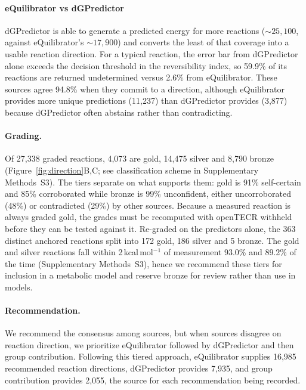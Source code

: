 \documentclass[unnumsec,webpdf,modern,large]{oup-authoring-template}
\begin{document}
\paragraph{eQuilibrator vs dGPredictor} dGPredictor is able to generate a predicted energy for more reactions ($\sim25,100$, against eQuilibrator's $\sim17,900$) and converts the least of that coverage into a usable reaction direction.
For a typical reaction, the error bar from dGPredictor alone exceeds the decision threshold in the reversibility index, so 59.9\% of its reactions are returned undetermined versus 2.6\% from eQuilibrator.
These sources agree 94.8\% when they commit to a direction, although eQuilibrator provides more unique predictions (11,237) than dGPredictor provides (3,877) because dGPredictor often abstains rather than contradicting.

\paragraph{Grading.} Of 27,338 graded reactions, 4,073 are gold, 14,475 silver and 8,790 bronze (Figure~\ref{fig:direction}B,C; see classification scheme in Supplementary Methods~S3).
The tiers separate on what supports them: gold is 91\% self-certain and 85\% corroborated while bronze is 99\% unconfident, either uncorroborated (48\%) or contradicted (29\%) by other sources.
Because a measured reaction is always graded gold, the grades must be recomputed with openTECR withheld before they can be tested against it.
Re-graded on the predictors alone, the 363 distinct anchored reactions split into 172 gold, 186 silver and 5 bronze.
The gold and silver reactions fall within 2\,kcal\,mol$^{-1}$ of measurement 93.0\% and 89.2\% of the time (Supplementary Methods~S3), hence we recommend these tiers for inclusion in a metabolic model and reserve bronze for review rather than use in models.

\paragraph{Recommendation.} We recommend the consensus among sources, but when sources disagree on reaction direction, we prioritize eQuilibrator followed by dGPredictor and then group contribution.
Following this tiered approach, eQuilibrator supplies 16,985 recommended reaction directions, dGPredictor provides 7,935, and group contribution provides 2,055, the source for each recommendation being recorded.
\end{document}
